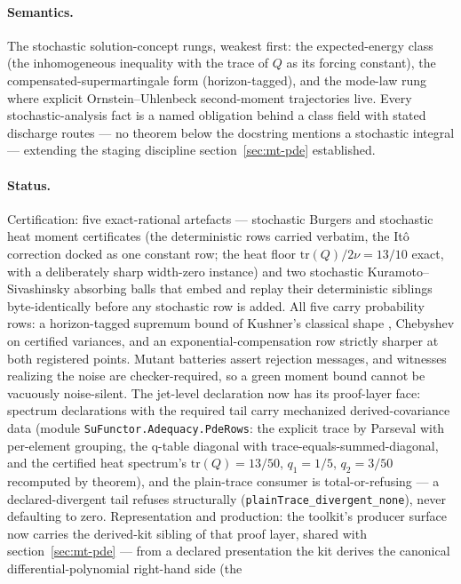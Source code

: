\paragraph{Semantics.} The stochastic solution-concept rungs, weakest
first: the expected-energy class (the inhomogeneous inequality with
the trace of $Q$ as its forcing constant), the
compensated-supermartingale form (horizon-tagged), and the mode-law
rung where explicit Ornstein--Uhlenbeck second-moment trajectories
live. Every stochastic-analysis fact is a named obligation behind a
class field with stated discharge routes --- no theorem below the
docstring mentions a stochastic integral --- extending the staging
discipline section~\ref{sec:mt-pde} established.

\paragraph{Status.} Certification: five exact-rational artefacts ---
stochastic Burgers and stochastic heat moment certificates (the
deterministic rows carried verbatim, the It\^o correction docked as
one constant row; the heat floor $\mathrm{tr}(Q)/2\nu = 13/10$ exact,
with a deliberately sharp width-zero instance) and two stochastic
Kuramoto--Sivashinsky absorbing balls that embed and replay their
deterministic siblings byte-identically before any stochastic row is
added. All five carry probability rows: a horizon-tagged supremum
bound of Kushner's classical shape \cite{kushner1967}, Chebyshev on
certified variances,
and an exponential-compensation row strictly sharper at both
registered points. Mutant batteries assert rejection messages, and
witnesses realizing the noise are checker-required, so a green moment
bound cannot be vacuously noise-silent. The jet-level declaration now
has its proof-layer face: spectrum declarations with the required
tail carry mechanized derived-covariance data (module
\texttt{SuFunctor.Adequacy.PdeRows}: the explicit trace by Parseval
with per-element grouping, the q-table diagonal with
trace-equals-summed-diagonal, and the certified heat spectrum's
$\mathrm{tr}(Q) = 13/50$, $q_1 = 1/5$, $q_2 = 3/50$ recomputed by
theorem), and the plain-trace consumer is total-or-refusing --- a
declared-divergent tail refuses structurally
(\texttt{plainTrace\_divergent\_none}), never defaulting to zero.
Representation and production: the toolkit's producer surface now
carries the derived-kit sibling of that proof layer, shared with
section~\ref{sec:mt-pde} --- from a declared presentation the kit
derives the canonical differential-polynomial right-hand side (the
